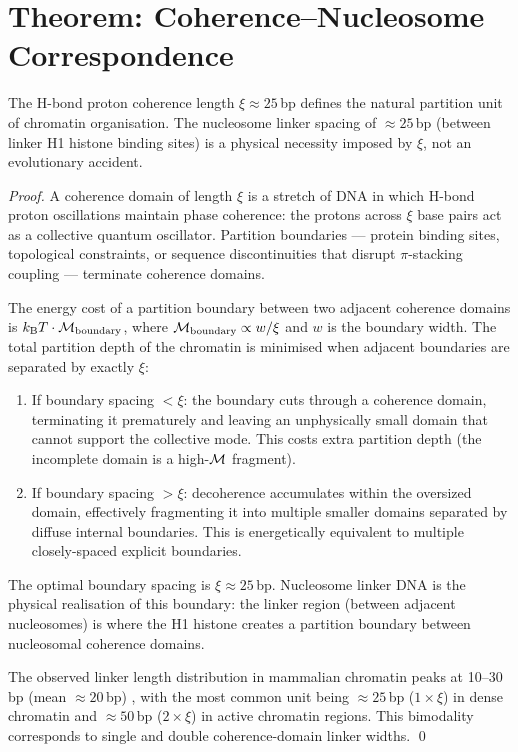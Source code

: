 \section{Theorem: Coherence--Nucleosome Correspondence}
\label{sec:nucleosome_correspondence}

\begin{theorem}
\label{thm:nucleosome_coherence}
The H-bond proton coherence length $\xi \approx 25$\,bp defines the natural
partition unit of chromatin organisation. The nucleosome linker spacing of
$\approx 25$\,bp (between linker H1 histone binding sites) is a physical
necessity imposed by $\xi$, not an evolutionary accident.
\end{theorem}

\begin{proof}
A coherence domain of length $\xi$ is a stretch of DNA in which H-bond proton
oscillations maintain phase coherence: the protons across $\xi$ base pairs
act as a collective quantum oscillator. Partition boundaries --- protein
binding sites, topological constraints, or sequence discontinuities that disrupt
$\pi$-stacking coupling --- terminate coherence domains.

The energy cost of a partition boundary between two adjacent coherence domains
is $k_{\mathrm{B}} T \cdot \mathcal{M}_{\mathrm{boundary}}$, where
$\mathcal{M}_{\mathrm{boundary}} \propto w/\xi$ and $w$ is the boundary width.
The total partition depth of the chromatin is minimised when adjacent boundaries
are separated by exactly $\xi$:
\begin{enumerate}[label=(\roman*)]
  \item If boundary spacing $< \xi$: the boundary cuts through a coherence
        domain, terminating it prematurely and leaving an unphysically small
        domain that cannot support the collective mode. This costs extra
        partition depth (the incomplete domain is a high-$\mathcal{M}$ fragment).
  \item If boundary spacing $> \xi$: decoherence accumulates within the
        oversized domain, effectively fragmenting it into multiple smaller
        domains separated by diffuse internal boundaries. This is energetically
        equivalent to multiple closely-spaced explicit boundaries.
\end{enumerate}
The optimal boundary spacing is $\xi \approx 25$\,bp. Nucleosome linker DNA
is the physical realisation of this boundary: the linker region (between
adjacent nucleosomes) is where the H1 histone creates a partition boundary
between nucleosomal coherence domains.

The observed linker length distribution in mammalian chromatin peaks at
10--30\,bp (mean $\approx 20$\,bp) \citep{Widom1992}, with the most common
unit being $\approx 25$\,bp ($1 \times \xi$) in dense chromatin and
$\approx 50$\,bp ($2 \times \xi$) in active chromatin regions. This bimodality
corresponds to single and double coherence-domain linker widths. \qed
\end{proof}

